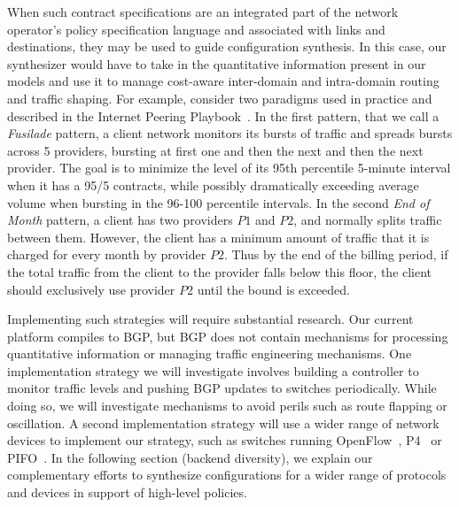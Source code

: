 When such contract specifications are an integrated part of the network operator's 
policy specification language and associated with links and destinations, 
they may be used to guide configuration synthesis.  
In this case,
our synthesizer would have to take in the quantitative information present in our models 
and use it to
manage cost-aware inter-domain and intra-domain routing and traffic shaping.  For example,
consider two paradigms used in practice and described in the Internet Peering Playbook~\cite{routingplaybook}.   
In the first pattern, that we call a {\em Fusilade} pattern, a client network monitors its bursts of traffic and
spreads bursts across 5 providers, bursting at first one and then the next and then
the next provider.  The goal is to minimize the level
of its 95th percentile 5-minute interval when it has a 95/5 contracts, while possibly
dramatically exceeding average volume when bursting in the 96-100 percentile intervals.
In the second {\em End of Month} pattern, a client has two providers $P1$ and $P2$, and normally splits traffic between them.  However, the client has a minimum amount of traffic that it is charged for every month by provider $P2$.   Thus by the end of the billing period, if the total traffic from the client to the provider falls below this floor, the client should exclusively use provider $P2$ until the bound is exceeded.

Implementing such strategies will require substantial research.  
Our current platform compiles to BGP, 
but BGP does not contain mechanisms for processing quantitative information or managing
traffic engineering mechanisms.  One implementation strategy we will investigate
involves building a controller to monitor traffic levels and pushing BGP
updates to switches periodically.  While doing so, we will investigate mechanisms to
avoid perils such as route flapping or oscillation.  A second implementation
strategy will use a wider range of network devices to implement our strategy,
such as switches running OpenFlow~\cite{openflow}, P4~\cite{P4} or PIFO~\cite{pifo}.
In the following section (backend diversity), we explain our complementary efforts 
to synthesize configurations
for a wider range of protocols and devices in support of high-level \Name policies.  



